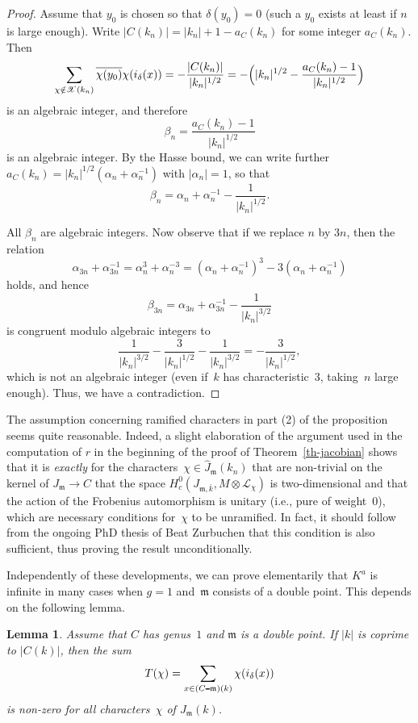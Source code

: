 \documentclass[12pt]{amsart}
\numberwithin{equation}{section}
\def\setminus{\mathchoice
    {\mathbin{\vrule height .62ex width 1.61ex depth -.38ex}}%
    {\mathbin{\vrule height .62ex width 1.61ex depth -.38ex}}%
    {\mathbin{\vrule height .50ex width 0.85ex depth -.28ex}}%
    {\mathbin{\vrule height .20ex width 0.570ex depth -.24ex}}%
}
\newcommand{\mfm}{\mathfrak{m}}
\theoremstyle{plain}
\newtheorem{lemma}[theorem]{Lemma}
\theoremstyle{remark}
\theoremstyle{definition}
\newcommand{\mcL}{\mathscr{L}}
\newcommand{\mcX}{\mathscr{X}}
\begin{document}
\begin{proof}
  Assume that $y_0$ is chosen so that $\delta(y_0)=0$ (such a $y_0$
  exists at least if $n$ is large enough). Write
  $|C(k_n)|=|k_n|+1-a_C(k_n)$ for some integer $a_C(k_n)$.
  Then
  \[
    \sum_{\chi\notin\mcX(k_n)}\overline{\chi(y_0)}\chi(i_{\delta}(x))=
    -\frac{|C(k_n)|}{|k_n|^{1/2}}= -\Bigl(|k_n|^{1/2}
    -\frac{a_C(k_n)-1}{|k_n|^{1/2}}\Bigr)
  \]
  is an algebraic integer, and therefore
  \[
    \beta_n=\frac{a_C(k_n)-1}{|k_n|^{1/2}}
  \]
  is an algebraic integer. By the Hasse bound, we can write further
  $a_C(k_n)=|k_n|^{1/2}(\alpha_n+\alpha_n^{-1})$ with $|\alpha_n|=1$, so
  that
  \[
    \beta_n=\alpha_n+\alpha_n^{-1}-\frac{1}{|k_n|^{1/2}}.
  \]

  All $\beta_n$ are algebraic integers. Now observe that if we replace
  $n$ by $3n$, then the relation
  \[
    \alpha_{3n}+\alpha_{3n}^{-1}=\alpha_n^3+\alpha_n^{-3}
    =(\alpha_n+\alpha_n^{-1})^3-3(\alpha_n+\alpha_n^{-1})
  \]
  holds, and hence
  \[
    \beta_{3n}=\alpha_{3n}+\alpha_{3n}^{-1}-\frac{1}{|k_n|^{3/2}}
  \]
  is congruent modulo algebraic integers to
  \[
    \frac{1}{|k_n|^{3/2}}-\frac{3}{|k_n|^{1/2}}-\frac{1}{|k_n|^{3/2}}
    =-\frac{3}{|k_n|^{1/2}},
  \]
  which is not an algebraic integer (even if~$k$ has
  characteristic~$3$, taking~$n$ large enough). Thus, we have a
  contradiction.
\end{proof}

The assumption concerning ramified characters in part (2) of the
proposition seems quite reasonable. Indeed, a slight elaboration of the
argument used in the computation of $r$ in the beginning of the proof of
Theorem~\ref{th-jacobian} shows that it is \emph{exactly} for the
characters~\hbox{$\chi\in\widehat{J}_{\mfm}(k_n)$} that are non-trivial
on the kernel of $J_{\mfm}\to C$ that the space
$H^0_c(J_{\mfm,\bar{k}},M\otimes \mcL_{\chi})$ is
two\nobreakdash-dimensional and that the action of the Frobenius
automorphism is unitary (i.e., pure of weight~$0$), which are necessary
conditions for~$\chi$ to be unramified.  In fact, it should follow from
the ongoing PhD thesis of Beat Zurbuchen that this condition is also
sufficient, thus proving the result unconditionally.

Independently of these developments, we can prove elementarily that
$K^a$ is infinite in many cases when $g=1$ and~$\mfm$ consists of a
double point. This depends on the following lemma.

\begin{lemma}\label{lm-nonzero}
  Assume that $C$ has genus~$1$ and $\mfm$ is a double point. If $|k|$
  is coprime to $|C(k)|$, then the sum
  \[
    T(\chi)=\sum_{x\in (C\setminus \mfm)(k)}\chi(i_{\delta}(x))
  \]
  is non-zero for all characters~$\chi$ of $J_{\mfm}(k)$.
\end{lemma}
\end{document}
